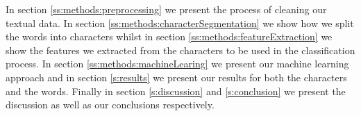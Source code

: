
In section \ref{ss:methods:preprocessing} we present the process of cleaning our textual data. In section \ref{ss:methods:characterSegmentation} we show how we split the words into characters whilst in section \ref{ss:methods:featureExtraction} we show the features we extracted from the characters to be used in the classification process. In section \ref{ss:methods:machineLearing} we present our machine learning approach and in section \ref{s:results} we present our results for both the characters and the words. Finally in section \ref{s:discussion} and \ref{s:conclusion} we present the discussion as well as our conclusions respectively.